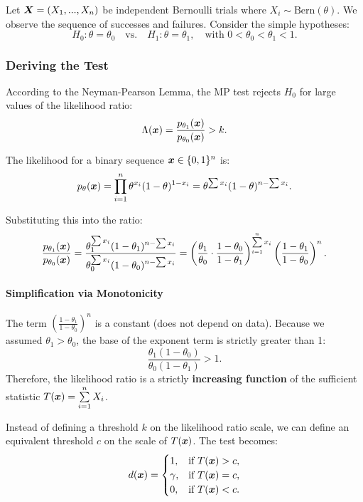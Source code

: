 \begin{ex}
    
Let $\boldsymbol{X} = (X_1, ..., X_n)$ be independent Bernoulli trials where $X_i \sim \text{Bern}(\theta)$. We observe the sequence of successes and failures.
Consider the simple hypotheses:
\[ H_0: \theta = \theta_0 \quad \text{vs.} \quad H_1: \theta = \theta_1, \quad \text{with } 0 < \theta_0 < \theta_1 < 1. \]

\subsubsection{Deriving the Test}
According to the Neyman-Pearson Lemma, the MP test rejects $H_0$ for large values of the likelihood ratio:
\[ \Lambda(\boldsymbol{x}) = \frac{p_{\theta_1}(\boldsymbol{x})}{p_{\theta_0}(\boldsymbol{x})} > k. \]

The likelihood for a binary sequence $\boldsymbol{x} \in \{0, 1\}^n$ is:
\[ p_\theta(\boldsymbol{x}) = \prod_{i=1}^n \theta^{x_i} (1-\theta)^{1-x_i} = \theta^{\sum x_i} (1-\theta)^{n - \sum x_i}. \]

Substituting this into the ratio:
\[
\frac{p_{\theta_1}(\boldsymbol{x})}{p_{\theta_0}(\boldsymbol{x})} 
= \frac{\theta_1^{\sum x_i} (1-\theta_1)^{n - \sum x_i}}{\theta_0^{\sum x_i} (1-\theta_0)^{n - \sum x_i}} 
= \left( \frac{\theta_1}{\theta_0} \cdot \frac{1-\theta_0}{1-\theta_1} \right)^{\sum\limits_{i=1}^n x_i} \left( \frac{1-\theta_1}{1-\theta_0} \right)^n.
\]

\paragraph{Simplification via Monotonicity}
The term $\left( \frac{1-\theta_1}{1-\theta_0} \right)^n$ is a constant (does not depend on data).
Because we assumed $\theta_1 > \theta_0$, the base of the exponent term is strictly greater than 1:
\[ \frac{\theta_1 (1-\theta_0)}{\theta_0 (1-\theta_1)} > 1. \]
Therefore, the likelihood ratio is a strictly \textbf{increasing function} of the sufficient statistic $T(\boldsymbol{x}) = \sum\limits_{i=1}^n X_i$.

Instead of defining a threshold $k$ on the likelihood ratio scale, we can define an equivalent threshold $c$ on the scale of $T(\boldsymbol{x})$. The test becomes:
\[
d(\boldsymbol{x}) = \begin{cases} 
1, & \text{if } T(\boldsymbol{x}) > c, \\ 
\gamma, & \text{if } T(\boldsymbol{x}) = c, \\ 
0, & \text{if } T(\boldsymbol{x}) < c. 
\end{cases}
\]


\end{ex}
